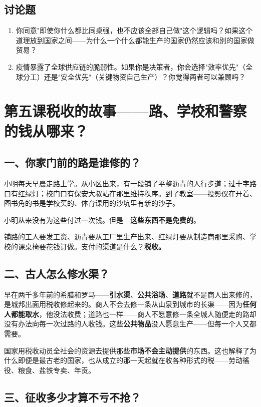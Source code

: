 \documentclass[a4paper,12pt]{ctexart}
\begin{document}
\subsection*{讨论题}
\begin{enumerate}
  \item 你同意"即使你什么都比同桌强，也不应该全部自己做"这个逻辑吗？如果这个道理放到国家之间——为什么一个什么都能生产的国家仍然应该和别的国家做贸易？
  \item 疫情暴露了全球供应链的脆弱性。如果你是决策者，你会选择"效率优先"（全球分工）还是"安全优先"（关键物资自己生产）？你觉得两者可以兼顾吗？
\end{enumerate}

\newpage
\section{\textcolor{orange!80!black}{第五课\quad 税收的故事——路、学校和警察的钱从哪来？}}

\subsection*{一、你家门前的路是谁修的？}

小明每天早晨走路上学。从小区出来，有一段铺了平整沥青的人行步道；过十字路口有红绿灯；校门口有保安大叔站在那里维持秩序。到了教室——投影仪在开着、图书角的书是学校买的、体育课用的沙坑里有新的沙子。

小明从来没有为这些付过一次钱。但是—\—\textbf{这些东西不是免费的}。

铺路的工人要发工资、沥青要从工厂里生产出来、红绿灯要从制造商那里采购、学校的课桌椅要花钱订做。支付的渠道是什么？\textbf{税收。}

\subsection*{二、古人怎么修水渠？}

早在两千多年前的希腊和罗马——\textbf{引水渠}、\textbf{公共浴场}、\textbf{道路}就不是商人出来修的，是城邦出面用税收修起来的。商人不会去修一条从山泉到城市的长渠——因为\textbf{任何人都能取水}，他没法收费；道路也一样——商人不愿意修一条全城人随便走的路却没有办法向每一次过路的人收钱。这些\textbf{公共物品}没人愿意生产——但每一个人又都需要。

国家用税收动员全社会的资源去提供那些\textbf{市场不会主动提供}的东西。这也解释了为什么即便是最古老的国家，也从成立的那一天起就在收各种形式的税——劳动徭役、粮食、盐铁专卖、年贡。

\subsection*{三、征收多少才算不亏不抢？}
\end{document}
